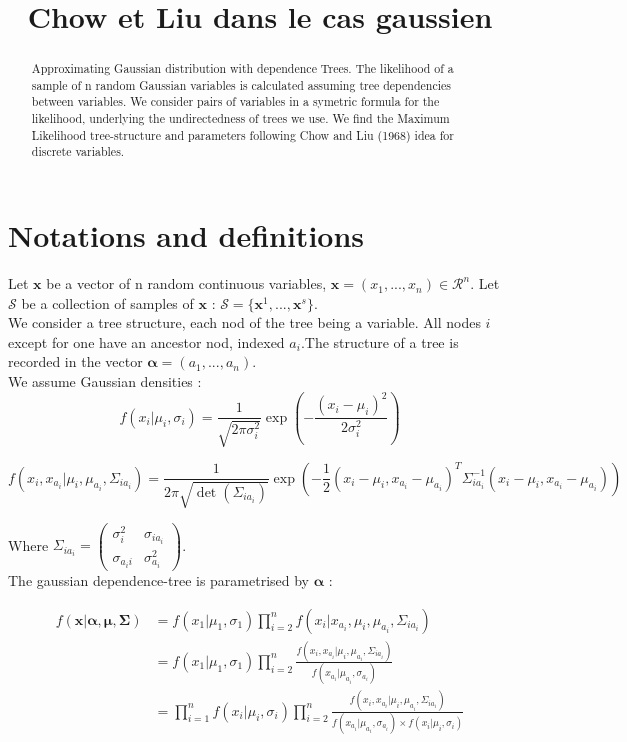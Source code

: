\documentclass[a4paper,10pt]{article}
\title{Chow et Liu dans le cas gaussien}
\author{}
\begin{document}
\maketitle

\begin{abstract}
Approximating Gaussian distribution with dependence Trees. The likelihood of a sample of n random Gaussian variables is calculated assuming
tree dependencies between variables. We consider pairs of variables in a symetric formula for the likelihood, underlying the undirectedness
of trees we use. We find the Maximum Likelihood tree-structure and parameters following Chow and Liu (1968) idea for discrete variables.
\end{abstract}

\section{Notations and definitions}
Let $\bm{x}$ be a vector of n random continuous variables, $\bm{x}=(x_1,...,x_n)\in \mathcal{R}^n$. Let
$\mathcal{S}$ be a collection of samples of $\bm{x}$ : $\mathcal{S}=\{\bm{x}^1,...,\bm{x}^s\}$.\\

We consider a tree structure, each nod of the tree being a variable. All nodes $i$ except for one have an ancestor nod,
 indexed $a_i$.The structure of a tree is recorded in the vector $\bm{\alpha}=(a_1,...,a_n)$.\\

We assume Gaussian densities : 
\[f(x_i |\mu_i,\sigma_i) = \frac{1}{\sqrt{2 \pi \sigma_i^2}}\exp\left(-\frac{(x_i-\mu_i)^2}{2\sigma_i^2} \right) \]


\[f(x_i,x_{a_i} |\mu_i,\mu_{a_i},\Sigma_{ia_i}) = \frac{1}{2 \pi\sqrt{ \det(\Sigma_{ia_i})}}\exp\left(-\frac{1}{2}(x_i-\mu_i,x_{a_i}-\mu_{a_i})^T \Sigma_{ia_i}^{-1}(x_i-\mu_i,x_{a_i}-\mu_{a_i}) \right) \]

Where $\Sigma_{ia_i} = \begin{pmatrix}
\sigma_i^2 & \sigma_{ia_i} \\
\sigma_{a_ii} & \sigma_{a_i}^2
\end{pmatrix}$.\\

The gaussian dependence-tree is parametrised by $\bm{\alpha}$ :



\begin{align*} 
f(\bm{x}|\bm{\alpha},\bm{\mu},\bm{\Sigma}) &= f(x_1|\mu_1, \sigma_1) \prod_{i=2}^{n} f(x_i|x_{a_i},\mu_i, \mu_{a_i},\Sigma_{ia_i})\\
 &= f(x_1|\mu_1, \sigma_1) \prod_{i=2}^{n} \frac{f(x_i,x_{a_i}|\mu_i, \mu_{a_i},\Sigma_{ia_i})}{f(x_{a_i}|\mu_{a_i},\sigma_{a_i})}\\
  &= \prod_{i=1}^{n}f(x_i|\mu_i, \sigma_i) \prod_{i=2}^{n} \frac{f(x_i,x_{a_i}|\mu_i, \mu_{a_i},\Sigma_{ia_i})}
  {f(x_{a_i}|\mu_{a_i},\sigma_{a_i})\times f(x_i|\mu_i,\sigma_i)}
\end{align*}
\end{document}
